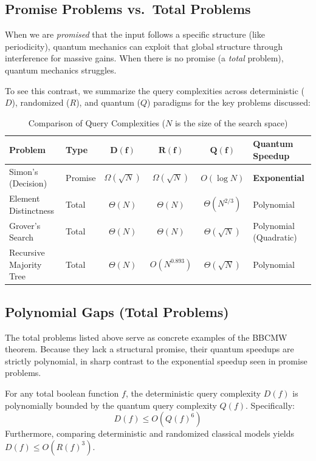 \subsection{Promise Problems vs.\ Total Problems}
When we are \textit{promised} that the input follows a specific structure (like periodicity), quantum mechanics can exploit that global structure through interference for massive gains. When there is no promise (a \textit{total} problem), quantum mechanics struggles. 

To see this contrast, we summarize the query complexities across deterministic ($D$), randomized ($R$), and quantum ($Q$) paradigms for the key problems discussed:

\begin{table}[h!]
    \centering
    \renewcommand{\arraystretch}{1.5}
    \begin{tabular}{|l|l|c|c|c|l|}
        \hline
        \textbf{Problem} & \textbf{Type} & $\mathbf{D(f)}$ & $\mathbf{R(f)}$ & $\mathbf{Q(f)}$ & \textbf{Quantum Speedup} \\ \hline
        Simon's (Decision) & Promise & $\Omega(\sqrt{N})$ & $\Omega(\sqrt{N})$ & $O(\log N)$ & \textbf{Exponential} \\ \hline
        Element Distinctness & Total & $\Theta(N)$ & $\Theta(N)$ & $\Theta(N^{2/3})$ & Polynomial \\ \hline
        Grover's Search & Total & $\Theta(N)$ & $\Theta(N)$ & $\Theta(\sqrt{N})$ & Polynomial (Quadratic) \\ \hline
        Recursive Majority Tree & Total & $\Theta(N)$ & $O(N^{0.893})$ & $\Theta(\sqrt{N})$ & Polynomial \\ \hline
    \end{tabular}
    \caption{Comparison of Query Complexities ($N$ is the size of the search space)}
    \label{tab:complexity_summary}
\end{table}

\subsection{Polynomial Gaps (Total Problems)}
The total problems listed above serve as concrete examples of the BBCMW theorem. Because they lack a structural promise, their quantum speedups are strictly polynomial, in sharp contrast to the exponential speedup seen in promise problems.

\begin{theorem}
    For any total boolean function $f$, the deterministic query complexity $D(f)$ is polynomially bounded by the quantum query complexity $Q(f)$. Specifically:
    \[ D(f) \leq O(Q(f)^6) \]
    Furthermore, comparing deterministic and randomized classical models yields $D(f) \leq O(R(f)^3)$.
\end{theorem}

